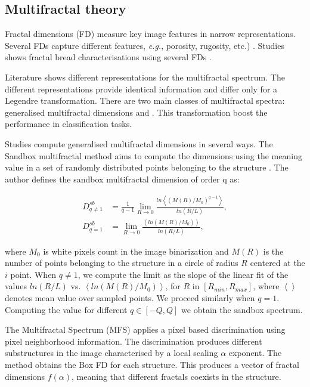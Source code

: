 \documentclass[final,5p,times]{elsarticle}
\begin{document}
\subsection{Multifractal theory}

Fractal dimensions (FD) measure key image features in narrow representations. Several FDs capture different features, {\em e.g.}, porosity, rugosity, etc.) . Studies shows fractal bread characterisations using several FDs \cite{Gonzales2008,Baravalle2012}. 

Literature shows different representations for the multifractal spectrum. The different representations provide identical information and differ only for a Legendre transformation. There are two main classes of multifractal spectra: generalised multifractal dimensions and . This transformation boost the performance in classification tasks.

Studies compute generalised multifractal dimensions  in several ways. The Sandbox multifractal method \cite{Tel1989} aims to compute the dimensions using the meaning value in a set of randomly distributed points belonging to the structure \cite{Debartolo2004}. The author defines the sandbox multifractal dimension of order q as:

 \begin{align}
D_{q\ne 1}^{sb} &= \frac{1}{q-1} \lim_{R \rightarrow 0}{
\frac{ln   { \left\langle  (M(R)/M_{0})^{q-1} \right\rangle   }}
{ln {(R/L)}       }},\\
D_{q=1}^{sb} &= \lim_{R \rightarrow 0}{
\frac{ \left\langle ln   { (M(R)/M_{0})  }  \right\rangle}
{ln {(R/L)}       }},
\end{align}

\noindent where $M_{0}$ is white pixels count in the image binarization and  $M(R)$ is the number of points belonging to the structure in a circle of radius $R$ centered at the $i$ point. When $q\ne1$, we compute the limit as the slope of the linear fit of the values $ln(R/L)$ vs. $ \left\langle ln   { (M(R)/M_{0})  }  \right\rangle$, for $R$ in $[R_{min}, R_{max}]$, where $ \left\langle   \right\rangle$ denotes mean value over sampled points. We proceed similarly when $q=1$. Computing the value for different $q \in [-Q,Q]$  we obtain the sandbox spectrum.


The Multifractal Spectrum (MFS) \cite{Xu2009} applies a pixel based discrimination using pixel neighborhood information. The discrimination produces different substructures in the image characterised by a local scaling $\alpha$ exponent. The method obtains the Box FD \cite{Peitgen2004} for each structure. This produces a vector of fractal dimensions $f(\alpha)$, meaning that different fractals coexists in the structure.
\end{document}
